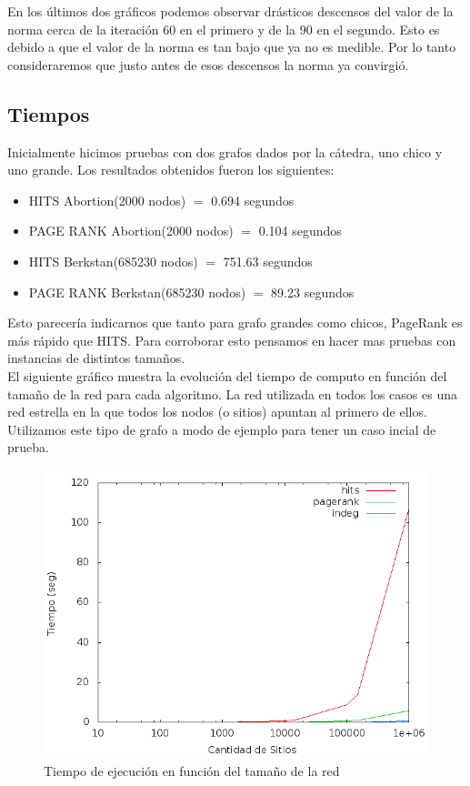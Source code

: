 En los últimos dos gráficos podemos observar drásticos descensos del valor de la norma cerca de la iteración 60 en el primero y de la 90 en el segundo. Esto es debido a que el valor de la norma es tan bajo que ya no es medible. Por lo tanto consideraremos que justo antes de esos descensos la norma ya convirgió.

\clearpage

\subsection{Tiempos}
Inicialmente hicimos pruebas con dos grafos dados por la cátedra, uno chico y uno grande. Los resultados obtenidos fueron los siguientes:
\begin{itemize}
\item{HITS Abortion(2000 nodos) $=$ 0.694 segundos }
\item{PAGE RANK Abortion(2000 nodos) $=$ 0.104 segundos }
\item{HITS Berkstan(685230 nodos) $=$ 751.63 segundos }
\item{PAGE RANK Berkstan(685230 nodos) $=$ 89.23 segundos }
\end{itemize}

Esto parecería indicarnos que tanto para grafo grandes como chicos, PageRank es más rápido que HITS. Para corroborar esto pensamos en hacer mas pruebas con instancias de distintos tamaños.\\
El siguiente gráfico muestra la evolución del tiempo de computo en función del tamaño de la red para cada algoritmo. La red utilizada en todos los casos es una red estrella en la que todos los nodos (o sitios) apuntan al primero de ellos. Utilizamos este tipo de grafo a modo de ejemplo para tener un caso incial de prueba.
 \begin{figure}[!htb]
 \begin{center}
    \includegraphics[scale=0.5]{imagenes/Tiempos.png}
    \caption{Tiempo de ejecución en función del tamaño de la red}
    \end{center}
 \end{figure}

